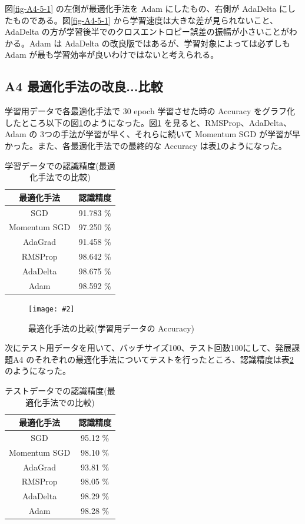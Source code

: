 \documentclass[a4paper,dvipdfmx]{jsarticle}
\newcommand{\image}[3]{
    \begin{figure}[H]
        \begin{center}
        \texttt{[image: \#2]}
        \end{center}
        \caption{#1}
        \label{#3}
    \end{figure}
}
\begin{document}
図\ref{fig-A4-5-1} の左側が最適化手法を Adam にしたもの、右側が AdaDelta にしたものである。図\ref{fig-A4-5-1} から学習速度は大きな差が見られないこと、AdaDelta の方が学習後半でのクロスエントロピー誤差の振幅が小さいことがわかる。Adam は AdaDelta の改良版ではあるが、学習対象によっては必ずしも Adam が最も学習効率が良いわけではないと考えられる。

\subsection*{A4 最適化手法の改良...比較}

学習用データで各最適化手法で 30 epoch 学習させた時の Accuracy をグラフ化したところ以下の図\ref{fig-A4-6-1}のようになった。図\ref{fig-A4-6-1} を見ると、RMSProp、AdaDelta、Adam の 3つの手法が学習が早く、それらに続いて Momentum SGD が学習が早かった。また、各最適化手法での最終的な Accuracy は表\ref{tableA4-6-1}のようになった。

\begin{table}[H]
\begin{center}
\caption{学習データでの認識精度(最適化手法での比較)}
  \begin{tabular}{|c|c|} \hline
    最適化手法 & 認識精度  \\ \hline \hline
    SGD & 91.783 \% \\ \hline
    Momentum SGD & 97.250 \% \\ \hline
    AdaGrad & 91.458 \% \\ \hline
    RMSProp & 98.642 \% \\ \hline
    AdaDelta & 98.675 \% \\ \hline
    Adam & 98.592 \% \\ \hline
  \end{tabular}
	\label{tableA4-6-1}
\end{center}
\end{table}

\image{最適化手法の比較(学習用データの Accuracy)}{report_a4-6-1.png}{fig-A4-6-1}

次にテスト用データを用いて、バッチサイズ100、テスト回数100にして、発展課題A4 のそれぞれの最適化手法についてテストを行ったところ、認識精度は表\ref{tableA4-6-2} のようになった。

\begin{table}[H]
\begin{center}
\caption{テストデータでの認識精度(最適化手法での比較)}
  \begin{tabular}{|c|c|} \hline
    最適化手法 & 認識精度  \\ \hline \hline
    SGD & 95.12 \% \\ \hline
    Momentum SGD & 98.10 \% \\ \hline
    AdaGrad & 93.81 \% \\ \hline
    RMSProp & 98.05 \% \\ \hline
    AdaDelta & 98.29 \% \\ \hline
    Adam & 98.28 \% \\ \hline
  \end{tabular}
	\label{tableA4-6-2}
\end{center}
\end{table}
\end{document}
